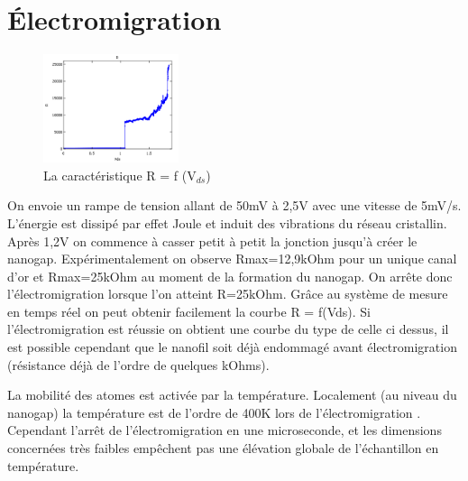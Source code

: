 \section{Électromigration}
\begin{figure}[h]
    \begin{center}
        \includegraphics[width=150px]{Images/Image_Electromigration_1.png}
        \caption{La caractéristique R = f (V$_{ds}$)}
        \label{fig:}
    \end{center}
\end{figure}
On envoie un rampe de tension allant de 50mV à 2,5V avec une vitesse de 5mV/s.
L’énergie est dissipé par effet Joule et induit des vibrations du réseau cristallin. Après 1,2V  on commence à casser petit à petit la jonction jusqu’à créer le nanogap. Expérimentalement on observe Rmax=12,9kOhm pour un unique canal d’or et Rmax=25kOhm au moment de la formation du nanogap. On arrête donc l’électromigration lorsque l’on atteint R=25kOhm.
Grâce au système de mesure en temps réel on peut obtenir facilement la courbe R = f(Vds). Si l’électromigration est réussie on obtient une courbe du type de celle ci dessus, il est possible cependant que le nanofil soit déjà endommagé avant électromigration (résistance déjà de l’ordre de quelques kOhms). 

La mobilité des atomes est activée par la température. Localement (au niveau du nanogap) la température est de l’ordre de 400K lors de l’électromigration \cite{11}. Cependant l’arrêt de l’électromigration en une microseconde, et les dimensions concernées très faibles empêchent pas une élévation globale de l’échantillon en température.
